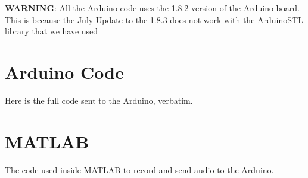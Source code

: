 \textbf{WARNING}: All the Arduino code uses the 1.8.2 version of the Arduino board. This is because the July Update to the 1.8.3 does not work with the ArduinoSTL library that we have used
\begin{subappendices}
    \renewcommand{\thesection}{\Alph{section}}
    \def\sectionautorefname{Appendix}

    \section{Arduino Code}
    \label{sec:arduinocode}
    Here is the full code sent to the Arduino, verbatim.

    

    \newpage
    \section{MATLAB}
    \label{sec:matlabcode}
    The code used inside MATLAB to record and send audio to the Arduino.

    
\end{subappendices}